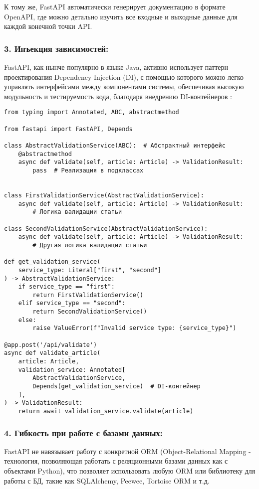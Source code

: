 К тому же, FastAPI автоматически генерирует документацию в формате OpenAPI,
где можно детально изучить все входные и выходные данные для каждой конечной точки API.

\subsubsection*{3. Инъекция зависимостей:}
FastAPI, как нынче популярно в языке Java, активно использует паттерн проектирования Dependency Injection (DI),
с помощью которого можно легко управлять интерфейсами между компонентами системы, обеспечивая высокую модульность 
и тестируемость кода, благодаря внедрению DI-контейнеров \cite{solid-principles-article}:

\begin{verbatim}
from typing import Annotated, ABC, abstractmethod

from fastapi import FastAPI, Depends

class AbstractValidationService(ABC):  # Абстрактный интерфейс
    @abstractmethod
    async def validate(self, article: Article) -> ValidationResult:
        pass  # Реализация в подклассах


class FirstValidationService(AbstractValidationService):
    async def validate(self, article: Article) -> ValidationResult:
        # Логика валидации статьи

class SecondValidationService(AbstractValidationService):
    async def validate(self, article: Article) -> ValidationResult:
        # Другая логика валидации статьи

def get_validation_service(
    service_type: Literal["first", "second"]
) -> AbstractValidationService:
    if service_type == "first":
        return FirstValidationService()
    elif service_type == "second":
        return SecondValidationService()
    else:
        raise ValueError(f"Invalid service type: {service_type}")

@app.post('/api/validate')
async def validate_article(
    article: Article,
    validation_service: Annotated[
        AbstractValidationService, 
        Depends(get_validation_service)  # DI-контейнер
    ],
) -> ValidationResult:
    return await validation_service.validate(article)
\end{verbatim}

\subsubsection*{4. Гибкость при работе с базами данных:}
FastAPI не навязывает работу с конкретной ORM 
(Object-Relational Mapping - технология, позволяющая работать с реляционными базами данных как с объектами Python),
что позволяет использовать любую ORM или библиотеку для работы с БД, такие как SQLAlchemy, Peewee, Tortoise ORM и т.д.

